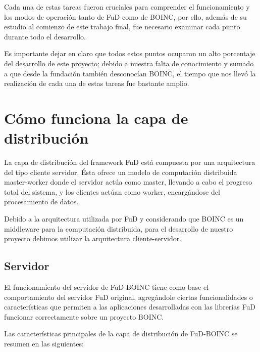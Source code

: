 Cada una de estas tareas fueron cruciales para comprender el funcionamiento y los modos de operación tanto de FuD como de BOINC, por ello, además de su estudio al comienzo de este trabajo final, fue necesario examinar cada punto durante todo el desarrollo.

Es importante dejar en claro que todos estos puntos ocuparon un alto porcentaje del desarrollo de este proyecto; debido a nuestra falta de conocimiento y sumado a que desde la fundación también desconocían BOINC, el tiempo que nos llevó la realización de cada una de estas tareas fue bastante amplio.


\section{Cómo funciona la capa de distribución}

La capa de distribución del framework FuD está compuesta por una arquitectura del tipo cliente servidor. Ésta ofrece un modelo de computación distribuida master-worker donde el servidor actúa como master, llevando a cabo el progreso total del sistema, y los clientes actúan como worker, encargándose del procesamiento de datos.

Debido a la arquitectura utilizada por FuD y considerando que BOINC es un middleware para la computación distribuida, para el desarrollo de nuestro proyecto debimos utilizar la arquitectura cliente-servidor.

\subsection{Servidor}

El funcionamiento del servidor de FuD-BOINC tiene como base el comportamiento del servidor FuD original, agregándole ciertas funcionalidades o características que permiten a las aplicaciones desarrolladas con las librerías FuD funcionar correctamente sobre un proyecto BOINC.

Las características principales de la capa de distribución de FuD-BOINC se resumen en las siguientes:


